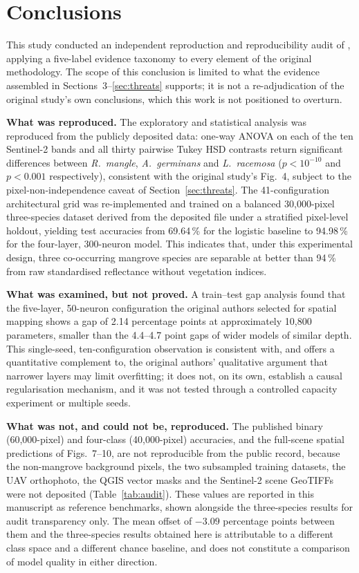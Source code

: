 \documentclass[10pt,twocolumn,a4paper]{article}
\begin{document}
\section{Conclusions}
\label{sec:conclusions}

This study conducted an independent reproduction and reproducibility audit of
\citet{monterrubio2025}, applying a five-label evidence taxonomy to every element of the original
methodology. The scope of this conclusion is limited to what the evidence assembled in
Sections~3--\ref{sec:threats} supports; it is not a re-adjudication of the original study's own
conclusions, which this work is not positioned to overturn.

\textbf{What was reproduced.} The exploratory and statistical analysis was reproduced from the
publicly deposited data: one-way ANOVA on each of the ten Sentinel-2 bands and all thirty pairwise
Tukey HSD contrasts return significant differences between \emph{R.\ mangle}, \emph{A.\ germinans}
and \emph{L.\ racemosa} ($p<10^{-10}$ and $p<0.001$ respectively), consistent with the original
study's Fig.~4, subject to the pixel-non-independence caveat of Section~\ref{sec:threats}. The
41-configuration architectural grid was re-implemented and trained on a balanced 30{,}000-pixel
three-species dataset derived from the deposited file under a stratified pixel-level holdout,
yielding test accuracies from 69.64\,\% for the logistic baseline to 94.98\,\% for the four-layer,
300-neuron model. This indicates that, under this experimental design, three co-occurring mangrove
species are separable at better than 94\,\% from raw standardised reflectance without vegetation
indices.

\textbf{What was examined, but not proved.} A train--test gap analysis found that the five-layer,
50-neuron configuration the original authors selected for spatial mapping shows a gap of 2.14
percentage points at approximately 10{,}800 parameters, smaller than the 4.4--4.7 point gaps of
wider models of similar depth. This single-seed, ten-configuration observation is consistent with,
and offers a quantitative complement to, the original authors' qualitative argument that narrower
layers may limit overfitting; it does not, on its own, establish a causal regularisation mechanism,
and it was not tested through a controlled capacity experiment or multiple seeds.

\textbf{What was not, and could not be, reproduced.} The published binary (60{,}000-pixel) and
four-class (40{,}000-pixel) accuracies, and the full-scene spatial predictions of Figs.~7--10, are
not reproducible from the public record, because the non-mangrove background pixels, the two
subsampled training datasets, the UAV orthophoto, the QGIS vector masks and the Sentinel-2 scene
GeoTIFFs were not deposited (Table~\ref{tab:audit}). These values are reported in this manuscript as
reference benchmarks, shown alongside the three-species results for audit transparency only. The
mean offset of $-3.09$ percentage points between them and the three-species results obtained here is
attributable to a different class space and a different chance baseline, and does not constitute a
comparison of model quality in either direction.
\end{document}
